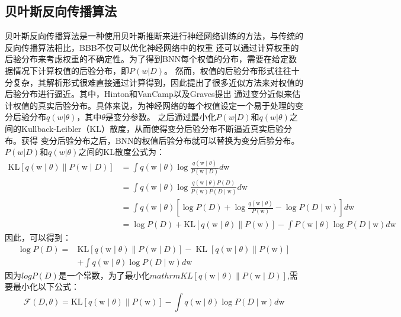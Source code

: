 \subsection{贝叶斯反向传播算法}
贝叶斯反向传播算法是一种使用贝叶斯推断来进行神经网络训练的方法，与传统的反向传播算法相比，BBB不仅可以优化神经网络中的权重
还可以通过计算权重的后验分布来考虑权重的不确定性。为了得到BNN每个权值的分布，需要在给定数据情况下计算权值的后验分布，即$P(w|D)$。
然而，权值的后验分布形式往往十分复杂，其解析形式很难直接通过计算得到，因此提出了很多近似方法来对权值的后验分布进行逼近。其中，Hinton和VanCamp\cite{hinton1993keeping}以及Graves\cite{graves2011practical}提出
通过变分近似来估计权值的真实后验分布。具体来说，为神经网络的每个权值设定一个易于处理的变分后验分布$q(w|\theta)$，其中$\theta$是变分参数。
之后通过最小化$P(w|D)$和$q(w|\theta)$之间的Kullback-Leibler（KL）散度，从而使得变分后验分布不断逼近真实后验分布。获得
变分后验分布之后，BNN的权值后验分布就可以替换为变分后验分布。$P(w|D)$和$q(w|\theta)$之间的KL散度公式为：
\begin{equation}
	\label{}
	\begin{aligned}
	\mathrm{KL}[q(\mathrm{w} \mid \theta) \| P(\mathrm{w} \mid D)] & =\int q(\mathrm{w} \mid \theta) \log \frac{q(\mathrm{w} \mid \theta)}{P(\mathrm{w} \mid D)} d \mathrm{w} \\
	& =\int q(\mathrm{w} \mid \theta) \log \frac{q(\mathrm{w} \mid \theta) P(D)}{P(\mathrm{w}) P(D \mid \mathrm{w})} d \mathrm{w} \\
	& =\int q(\mathrm{w} \mid \theta)\left[\log P(D)+\log \frac{q(\mathrm{w} \mid \theta)}{P(\mathrm{w})}-\log P(D \mid \mathrm{w})\right] d \mathrm{w} \\
	& =\log P(D)+\mathrm{KL}[q(\mathrm{w} \mid \theta) \| P(\mathrm{w})]-\int P(\mathrm{w} \mid \theta) \log P(D \mid \mathrm{w}) d \mathrm{w}
	\end{aligned}
\end{equation}
因此，可以得到：
\begin{equation}
	\label{}
	\begin{aligned}
	\log P(D)= & \mathrm{KL}[q(\mathrm{w} \mid \theta) \| P(\mathrm{w} \mid D)]-\operatorname{KL}[q(\mathrm{w} \mid \theta) \| P(\mathrm{w})] \\
	& +\int q(\mathrm{w} \mid \theta) \log P(D \mid \mathrm{w}) d \mathrm{w}
	\end{aligned}
\end{equation}
因为$log P(D)$是一个常数，为了最小化$mathrm{KL}[q(\mathrm{w} \mid \theta) \| P(\mathrm{w} \mid D)]$,需要最小化以下公式：
\begin{equation}
	\label{}
	\mathcal{F}(D, \theta)=\mathrm{KL}[q(\mathrm{w} \mid \theta) \| P(\mathrm{w})]-\int q(\mathrm{w} \mid \theta) \log P(D \mid \mathrm{w}) d \mathrm{w}
\end{equation}
